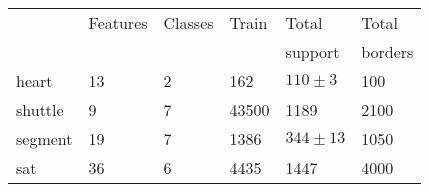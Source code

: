 \begin{tabular}{|l|lllll|}
	\hline
	& Features & Classes & Train & Total & Total \\
	& & & & support & borders \\\hline
heart & 13 & 2 & 162 & $110\pm3$ & 100 \\
	shuttle & 9 & 7 & 43500 & 1189 & 2100 \\
	segment & 19 & 7 & 1386 & $344\pm13$ & 1050 \\
	sat & 36 & 6 & 4435 & 1447 & 4000 \\\hline
\end{tabular}

